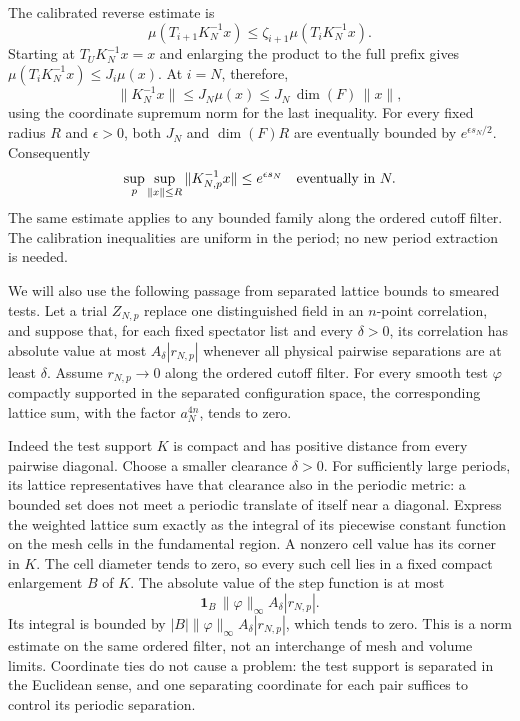 The calibrated reverse estimate is
\[
 \mu(T_{i+1}K_N^{-1}x)\leq\zeta_{i+1}\mu(T_iK_N^{-1}x).
\]
Starting at $T_UK_N^{-1}x=x$ and enlarging the product to the full
prefix gives
$\mu(T_iK_N^{-1}x)\leq J_i\mu(x)$.
At $i=N$, therefore,
\[
 \|K_N^{-1}x\|\leq J_N\mu(x)
            \leq J_N\,\dim(F)\,\|x\|,
\]
using the coordinate supremum norm for the last inequality. For every
fixed radius $R$ and $\epsilon>0$, both $J_N$ and
$\dim(F)R$ are eventually bounded by $e^{\epsilon s_N/2}$.
Consequently
\begin{equation}\label{eq:ope-bounded-bare}
 \sup_p\sup_{\|x\|\leq R}\|K_{N,p}^{-1}x\|
       \leq e^{\epsilon s_N}
 \quad\hbox{eventually in }N.
\end{equation}
The same estimate applies to any bounded family along the ordered
cutoff filter. The calibration inequalities are uniform in the period;
no new period extraction is needed.

We will also use the following passage from separated lattice bounds
to smeared tests. Let a trial $Z_{N,p}$ replace one distinguished field
in an $n$-point correlation, and suppose that, for each fixed spectator
list and every $\delta>0$, its correlation has absolute value at most
$A_\delta|r_{N,p}|$ whenever all physical pairwise separations are at
least $\delta$. Assume $r_{N,p}\to0$ along the ordered cutoff filter.
For every smooth test $\varphi$ compactly supported in the separated
configuration space, the corresponding lattice sum, with the factor
$a_N^{4n}$, tends to zero.

Indeed the test support $K$ is compact and has positive distance from
every pairwise diagonal. Choose a smaller clearance $\delta>0$.
For sufficiently large periods, its lattice representatives have that
clearance also in the periodic metric: a bounded set does not meet a
periodic translate of itself near a diagonal. Express the weighted
lattice sum exactly as the integral of its piecewise constant function
on the mesh cells in the fundamental region. A nonzero cell value has
its corner in $K$. The cell diameter tends to zero, so every such cell
lies in a fixed compact enlargement $B$ of $K$. The absolute value of
the step function is at most
\[
 \boldsymbol1_B\,\|\varphi\|_\infty A_\delta |r_{N,p}|.
\]
Its integral is bounded by
$|B|\|\varphi\|_\infty A_\delta |r_{N,p}|$, which tends to zero.
This is a norm estimate on the same ordered filter, not an interchange
of mesh and volume limits. Coordinate ties do not cause a problem:
the test support is separated in the Euclidean sense, and one
separating coordinate for each pair suffices to control its periodic
separation.

